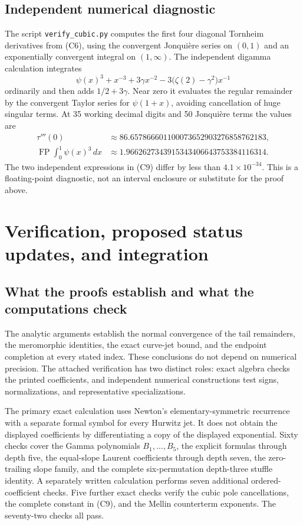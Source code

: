 \documentclass[11pt,letterpaper]{article}
\numberwithin{equation}{section}
\theoremstyle{definition}
\theoremstyle{remark}
\begin{document}
\subsection{Independent numerical diagnostic}

The script \texttt{verify\_cubic.py} computes the first four diagonal
Tornheim derivatives from (C6), using the convergent Jonqui\`ere series
on $(0,1)$ and an exponentially convergent integral on $(1,\infty)$.
The independent digamma calculation integrates
\[
 \psi(x)^3+x^{-3}+3\gamma x^{-2}
                -3\bigl(\zeta(2)-\gamma^2\bigr)x^{-1}
\]
ordinarily and then adds $1/2+3\gamma$. Near zero it evaluates the
regular remainder by the convergent Taylor series for $\psi(1+x)$,
avoiding cancellation of huge singular terms.
At 35 working decimal digits and 50 Jonqui\`ere terms the values are
\begin{align*}
 \tau'''(0)&\approx86.657866601100073652903276858762183,\\
 \operatorname{FP}\int_0^1\psi(x)^3\,dx
 &\approx1.9662627343915343406643753384116314.
\end{align*}
The two independent expressions in (C9) differ by less than
$4.1\times10^{-34}$. This is a floating-point diagnostic, not an
interval enclosure or substitute for the proof above.




\section{Verification, proposed status updates, and integration}
\label{sec:verification}

\subsection{What the proofs establish and what the computations check}

The analytic arguments establish the normal convergence of the tail
remainders, the meromorphic identities, the exact curve-jet bound,
and the endpoint completion at every stated index. These conclusions
do not depend on numerical precision. The attached verification has
two distinct roles: exact algebra checks the printed coefficients,
and independent numerical constructions test signs, normalizations,
and representative specializations.

The primary exact calculation uses Newton's elementary-symmetric
recurrence with a separate formal symbol for every Hurwitz jet. It
does not obtain the displayed coefficients by differentiating a copy
of the displayed exponential. Sixty checks cover the Gamma polynomials
$B_1,\ldots,B_5$, the explicit formulas through depth five, the
equal-slope Laurent coefficients through depth seven, the zero-trailing
slope family, and the complete six-permutation depth-three stuffle
identity. A separately written calculation performs seven additional
ordered-coefficient checks. Five further exact checks verify the
cubic pole cancellations, the complete constant in (C9), and the
Mellin counterterm exponents. The seventy-two checks all pass.
\end{document}
